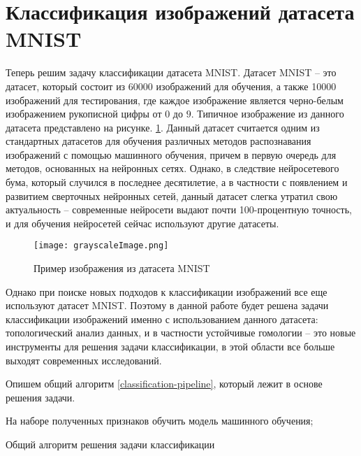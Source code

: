 \section{Классификация изображений датасета MNIST}

Теперь решим задачу классификации датасета MNIST.
Датасет MNIST -- это датасет, который состоит из 60000 изображений для обучения, а также 10000 изображений для тестирования, где каждое изображение является черно-белым изображением рукописной цифры от $0$ до $9$. Типичное изображение из данного датасета представлено на рисунке. \ref{mnist-example}. Данный датасет считается одним из стандартных датасетов для обучения различных методов распознавания изображений с помощью машинного обучения, причем в первую очередь для методов, основанных на нейронных сетях. Однако, в следствие нейросетевого бума, который случился в последнее десятилетие, а в частности с появлением и развитием сверточных нейронных сетей, данный датасет слегка утратил свою актуальность -- современные нейросети выдают почти 100-процентную точность, и для обучения нейросетей сейчас используют другие датасеты. 

\begin{figure}[!htbp]
	\begin{center}
		\texttt{[image: grayscaleImage.png]}\\
		\caption{Пример изображения из датасета MNIST}
		\label{mnist-example}
	\end{center}
\end{figure}

Однако при поиске новых подходов к классификации изображений все еще используют датасет MNIST. Поэтому в данной работе будет решена задачи классификации изображений именно с использованием данного датасета: топологический анализ данных, и в частности устойчивые гомологии -- это новые инструменты для решения задачи классификации, в этой области все больше выходят современных исследований.

Опишем общий алгоритм \ref{classification-pipeline}, который лежит в основе решения задачи.

\medskip
\begin{algorithm}[H]
	\small
	\SetAlgoLined
	
	На наборе полученных признаков обучить модель машинного обучения;
	\caption{Общий алгоритм решения задачи классификации}
	\label{classification-pipeline}
\end{algorithm}
\medskip

